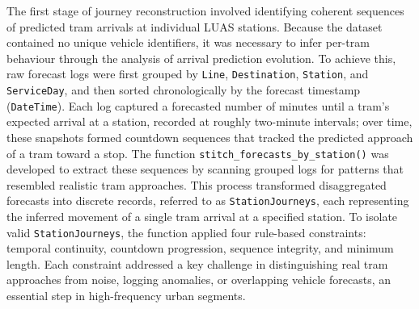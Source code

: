     The first stage of journey reconstruction involved identifying coherent sequences of predicted tram arrivals at individual LUAS stations. Because the dataset contained no unique vehicle identifiers, it was necessary to infer per-tram behaviour through the analysis of arrival prediction evolution. To achieve this, raw forecast logs were first grouped by \texttt{Line}, \texttt{Destination}, \texttt{Station}, and \texttt{ServiceDay}, and then sorted chronologically by the forecast timestamp (\texttt{DateTime}). Each log captured a forecasted number of minutes until a tram’s expected arrival at a station, recorded at roughly two-minute intervals; over time, these snapshots formed countdown sequences that tracked the predicted approach of a tram toward a stop. The function \texttt{stitch\_forecasts\_by\_station()} was developed to extract these sequences by scanning grouped logs for patterns that resembled realistic tram approaches. This process transformed disaggregated forecasts into discrete records, referred to as \texttt{StationJourneys}, each representing the inferred movement of a single tram arrival at a specified station. To isolate valid \texttt{StationJourneys}, the function applied four rule-based constraints: temporal continuity, countdown progression, sequence integrity, and minimum length. Each constraint addressed a key challenge in distinguishing real tram approaches from noise, logging anomalies, or overlapping vehicle forecasts, an essential step in high-frequency urban segments.

